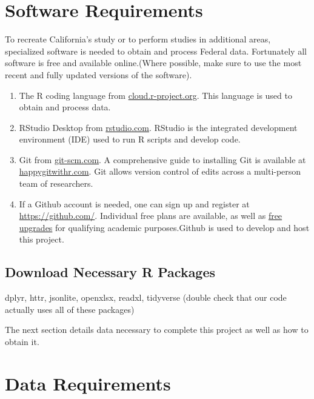 \documentclass[
]{book}
\begin{document}
\hypertarget{software-requirements}{%
\chapter{Software Requirements}\label{software-requirements}}

To recreate California's study or to perform studies in additional areas, specialized software is needed to obtain and process Federal data. Fortunately all software is free and available online.(Where possible, make sure to use the most recent and fully updated versions of the software).

\begin{enumerate}
\def\labelenumi{\arabic{enumi}.}
\item
  The R coding language from \href{https://cloud.r-project.org/}{cloud.r-project.org}. This language is used to obtain and process data.
\item
  RStudio Desktop from \href{https://rstudio.com/products/rstudio/download/\#download}{rstudio.com}. RStudio is the integrated development environment (IDE) used to run R scripts and develop code.
\item
  Git from \href{https://git-scm.com/downloads}{git-scm.com}. A comprehensive guide to installing Git is available at \href{https://happygitwithr.com/install-git.html}{happygitwithr.com}. Git allows version control of edits across a multi-person team of researchers.
\item
  If a Github account is needed, one can sign up and register at \url{https://github.com/}. Individual free plans are available, as well as \href{https://help.github.com/en/articles/applying-for-an-educator-or-researcher-discount}{free upgrades} for qualifying academic purposes.Github is used to develop and host this project.
\end{enumerate}

\hypertarget{download-necessary-r-packages}{%
\section{Download Necessary R Packages}\label{download-necessary-r-packages}}

dplyr, httr, jsonlite, openxlsx, readxl, tidyverse (double check that our code actually uses all of these packages)

The next section details data necessary to complete this project as well as how to obtain it.

\hypertarget{data-requirements}{%
\chapter{Data Requirements}\label{data-requirements}}
\end{document}
